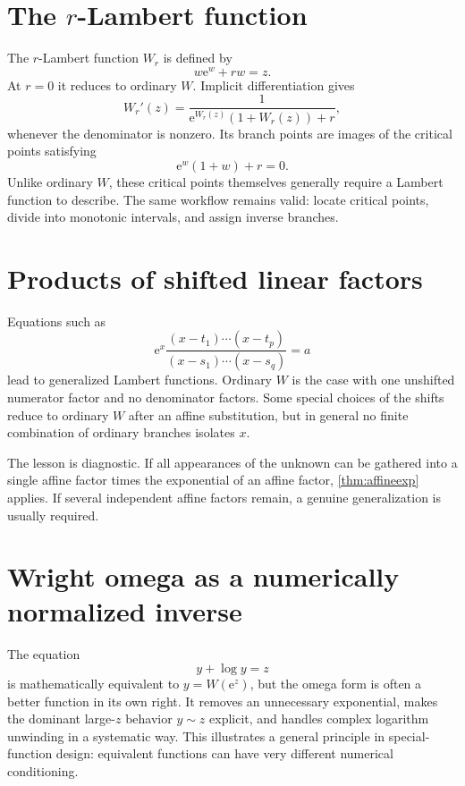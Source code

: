 \documentclass[11pt,oneside]{book}
\theoremstyle{definition}
\theoremstyle{remark}
\newcommand{\ee}{\mathrm e}
\begin{document}
\section{The $r$-Lambert function}

The $r$-Lambert function $W_r$ is defined by
\begin{equation}\label{eq:rLambert}
 w\ee^w+r w=z.
\end{equation}
At $r=0$ it reduces to ordinary $W$.  Implicit differentiation gives
\begin{equation}\label{eq:rLambertderivative}
 W_r'(z)=
 \frac{1}{\ee^{W_r(z)}(1+W_r(z))+r},
\end{equation}
whenever the denominator is nonzero.  Its branch points are images of the
critical points satisfying
\[
 \ee^w(1+w)+r=0.
\]
Unlike ordinary $W$, these critical points themselves generally require a
Lambert function to describe.  The same workflow remains valid: locate
critical points, divide into monotonic intervals, and assign inverse branches.

\section{Products of shifted linear factors}

Equations such as
\begin{equation}\label{eq:generalizedlambert}
 \ee^x
 \frac{(x-t_1)\cdots(x-t_p)}{(x-s_1)\cdots(x-s_q)}=a
\end{equation}
lead to generalized Lambert functions.  Ordinary $W$ is the case with one
unshifted numerator factor and no denominator factors.  Some special choices
of the shifts reduce to ordinary $W$ after an affine substitution, but in
general no finite combination of ordinary branches isolates $x$.

The lesson is diagnostic.  If all appearances of the unknown can be gathered
into a single affine factor times the exponential of an affine factor,
\cref{thm:affineexp} applies.  If several independent affine factors
remain, a genuine generalization is usually required.

\section{Wright omega as a numerically normalized inverse}

The equation
\[
 y+\log y=z
\]
is mathematically equivalent to $y=W(\ee^z)$, but the omega form is often a
better function in its own right.  It removes an unnecessary exponential,
makes the dominant large-$z$ behavior $y\sim z$ explicit, and handles complex
logarithm unwinding in a systematic way.  This illustrates a general
principle in special-function design: equivalent functions can have very
different numerical conditioning.
\end{document}
